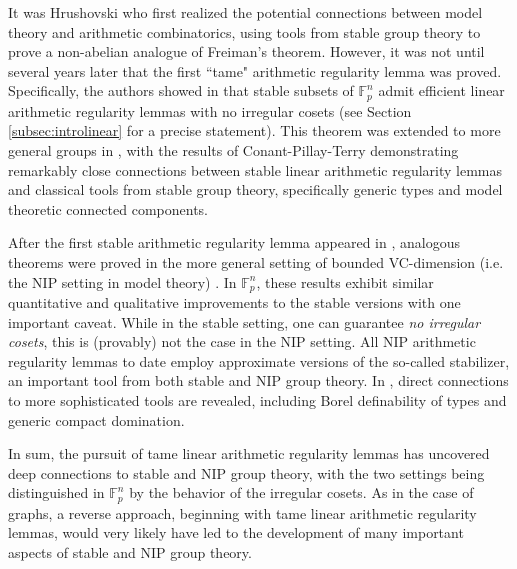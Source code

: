\documentclass[12pt,oneside,british,a4wide]{amsart}
\numberwithin{equation}{section}
\theoremstyle{definition}
\def\F{\mathbb{F}}
\begin{document}
It was Hrushovski \cite{Hrushovski.2012} who first realized the potential connections between model theory and arithmetic combinatorics, using tools from stable group theory to prove a non-abelian analogue of Freiman's theorem. However, it was not until several years later that the first ``tame" arithmetic regularity lemma was proved. Specifically, the authors showed in \cite{Terry.2019} that stable subsets of $\F_p^n$ admit efficient linear arithmetic regularity lemmas with no irregular cosets (see Section \ref{subsec:introlinear} for a precise statement).  This theorem was extended to more general groups in \cite{Terry.2020, Conant.2017p4, Conant.2020}, with the results of Conant-Pillay-Terry \cite{Conant.2017p4} demonstrating remarkably close connections between stable linear arithmetic regularity lemmas and classical tools from stable group theory, specifically generic types and model theoretic connected components.

After the first stable arithmetic regularity lemma appeared in \cite{Terry.2019}, analogous theorems were proved in the more general setting of bounded VC-dimension (i.e. the NIP setting in model theory) \cite{Sisask.2018,Alon.2018is,Conant.2018zd,CT}.   In $\F_p^n$, these results exhibit similar quantitative and qualitative improvements to the stable versions with one important caveat.  While in the stable setting, one can guarantee \emph{no irregular cosets}, this is (provably) not the case in the NIP setting.  All NIP arithmetic regularity lemmas to date employ approximate versions of the so-called stabilizer, an important tool from both stable and NIP group theory.  In \cite{Conant.2018zd}, direct connections to more sophisticated tools are revealed,  including Borel definability of types and generic compact domination.   



In sum, the pursuit of tame linear arithmetic regularity lemmas has uncovered deep connections to stable and NIP group theory, with the two settings being distinguished in $\F_p^n$ by the behavior of the irregular cosets.   As in the case of graphs, a reverse approach, beginning with tame linear arithmetic regularity lemmas, would very likely have led to the development of many important aspects of stable and NIP group theory.
\end{document}
